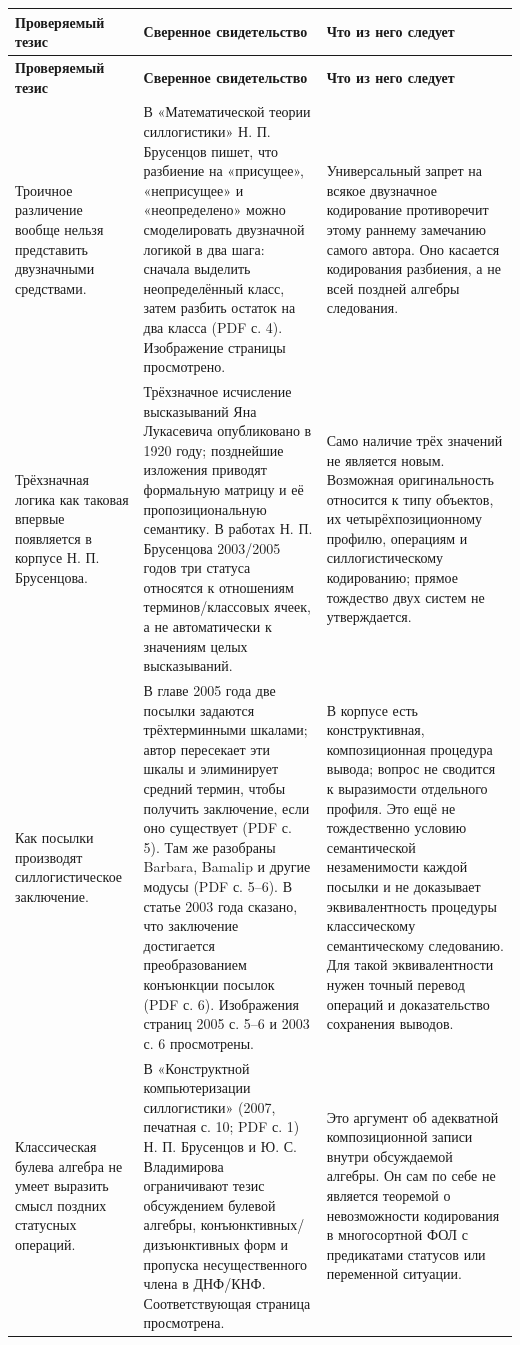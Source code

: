\documentclass[12pt,a4paper]{article}
\begin{document}
\begin{longtable}{P{0.22\textwidth}P{0.36\textwidth}P{0.30\textwidth}}
\toprule
\textbf{Проверяемый тезис} & \textbf{Сверенное свидетельство} & \textbf{Что из него следует} \\
\midrule
\endfirsthead
\toprule
\textbf{Проверяемый тезис} & \textbf{Сверенное свидетельство} & \textbf{Что из него следует} \\
\midrule
\endhead
Троичное различение вообще нельзя представить двузначными средствами. & В «Математической теории силлогистики» Н. П. Брусенцов пишет, что разбиение на «присущее», «неприсущее» и «неопределено» можно смоделировать двузначной логикой в два шага: сначала выделить неопределённый класс, затем разбить остаток на два класса (PDF с. 4). Изображение страницы просмотрено. & Универсальный запрет на всякое двузначное кодирование противоречит этому раннему замечанию самого автора. Оно касается кодирования разбиения, а не всей поздней алгебры следования. \\
Трёхзначная логика как таковая впервые появляется в корпусе Н. П. Брусенцова. & Трёхзначное исчисление высказываний Яна Лукасевича опубликовано в 1920 году; позднейшие изложения приводят формальную матрицу и её пропозициональную семантику. В работах Н. П. Брусенцова 2003/2005 годов три статуса относятся к отношениям терминов/классовых ячеек, а не автоматически к значениям целых высказываний. & Само наличие трёх значений не является новым. Возможная оригинальность относится к типу объектов, их четырёхпозиционному профилю, операциям и силлогистическому кодированию; прямое тождество двух систем не утверждается. \\
Как посылки производят силлогистическое заключение. & В главе 2005 года две посылки задаются трёхтерминными шкалами; автор пересекает эти шкалы и элиминирует средний термин, чтобы получить заключение, если оно существует (PDF с. 5). Там же разобраны Barbara, Bamalip и другие модусы (PDF с. 5–6). В статье 2003 года сказано, что заключение достигается преобразованием конъюнкции посылок (PDF с. 6). Изображения страниц 2005 с. 5–6 и 2003 с. 6 просмотрены. & В корпусе есть конструктивная, композиционная процедура вывода; вопрос не сводится к выразимости отдельного профиля. Это ещё не тождественно условию семантической незаменимости каждой посылки и не доказывает эквивалентность процедуры классическому семантическому следованию. Для такой эквивалентности нужен точный перевод операций и доказательство сохранения выводов. \\
Классическая булева алгебра не умеет выразить смысл поздних статусных операций. & В «Конструктной компьютеризации силлогистики» (2007, печатная с. 10; PDF с. 1) Н. П. Брусенцов и Ю. С. Владимирова ограничивают тезис обсуждением булевой алгебры, конъюнктивных/дизъюнктивных форм и пропуска несущественного члена в ДНФ/КНФ. Соответствующая страница просмотрена. & Это аргумент об адекватной композиционной записи внутри обсуждаемой алгебры. Он сам по себе не является теоремой о невозможности кодирования в многосортной ФОЛ с предикатами статусов или переменной ситуации. \\

\end{longtable}
\end{document}
